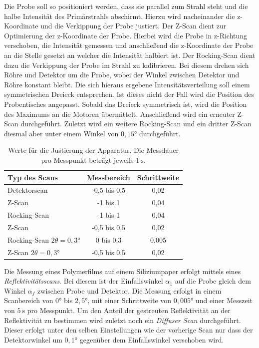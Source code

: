 Die Probe soll so positioniert werden, dass sie parallel zum Strahl steht und die halbe Intensität des Primärstrahls abschirmt.
Hierzu wird nacheinander die z-Koordinate und die Verkippung der Probe justiert.
Der Z-Scan dient zur Optimierung der z-Koordinate der Probe.
Hierbei wird die Probe in z-Richtung verschoben, die Intensität gemessen und anschließend die z-Koordinate der Probe an die Stelle gesetzt an welcher die Intensität halbiert ist.
Der Rocking-Scan dient dazu die Verkippung der Probe im Strahl zu kalibrieren.
Bei diesem drehen sich Röhre und Detektor um die Probe, wobei der Winkel zwischen Detektor und Röhre konstant bleibt.
Die sich hieraus ergebene Intensitätsverteilung soll einem symmetrischen Dreieck entsprechen.
Ist dieses nicht der Fall wird die Position des Probentisches angepasst.
Sobald das Dreieck symmetrisch ist, wird die Position des Maximums an die Motoren übermittelt.
Anschließend wird ein erneuter Z-Scan durchgeführt.
Zuletzt wird ein weitere Rocking-Scan und ein dritter Z-Scan diesmal aber unter einem Winkel von $0,15°$ durchgeführt.
\begin{table}[H]
    \centering
    \caption{Werte für die Justierung der Apparatur. Die Messdauer pro Messpunkt beträgt jeweils $\SI{1}{\s}$.}
    \label{tab:ttab1}
    \begin{tabular}{l c c }
        \toprule
        {Typ des Scans} & {Messbereich} & {Schrittweite}\\
        \midrule
        Detektorscan                    & -0,5 bis 0,5   & 0,02 \\
        Z-Scan                          & -1 bis 1       & 0,04 \\
        Rocking-Scan                    & -1 bis 1       & 0,04 \\
        Z-Scan                          & -0,5 bis 0,5   & 0,02 \\
        Rocking-Scan $2\theta = 0,3°$   & 0 bis 0,3      & 0,005\\
        Z-Scan $2\theta = 0,3°$         & -0,5 bis 0,5   & 0,02 \\
        \bottomrule
    \end{tabular}
\end{table}

Die Messung eines Polymerfilms auf einem Siliziumpaper erfolgt mittels eines \textit{Reflektivitätsscans}.
Bei diesem ist der Einfallswinkel $\alpha_1$ auf die Probe gleich dem Winkel $\alpha_f$ zwischen Probe und Detektor.
Die Messung erfolgt in einem Scanbereich von $0°$ bis $2,5°$, mit einer Schrittweite von $0,005°$ und einer Messzeit von $\SI{5}{\s}$ pro Messpunkt.
Um den Anteil der gestreuten Reflektivität an der Reflektivität zu bestimmen wird zuletzt noch ein \textit{Diffuser Scan} durchgeführt.
Dieser erfolgt unter den selben Einstellungen wie der vorherige Scan nur dass der Detektorwinkel um $0,1°$ gegenüber dem Einfallswinkel verschoben wird.
